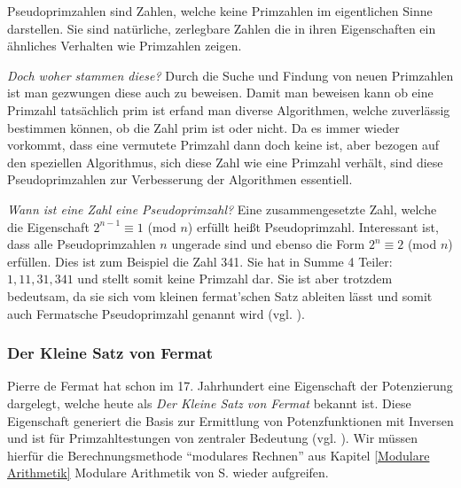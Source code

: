 \documentclass[12pt,a4paper]{article}
\theoremstyle{definition}
\begin{document}
Pseudoprimzahlen sind Zahlen, welche keine Primzahlen im eigentlichen Sinne darstellen.
Sie sind natürliche, zerlegbare Zahlen die in ihren Eigenschaften ein ähnliches Verhalten wie Primzahlen zeigen.

\textit{Doch woher stammen diese?}\newline
Durch die Suche und Findung von neuen Primzahlen ist man gezwungen diese auch zu beweisen.
Damit man beweisen kann ob eine Primzahl tatsächlich prim ist erfand man diverse Algorithmen, welche zuverlässig bestimmen können, ob die Zahl prim ist oder nicht.
Da es immer wieder vorkommt, dass eine vermutete Primzahl dann doch keine ist, aber bezogen auf den speziellen Algorithmus, sich diese Zahl wie eine Primzahl verhält, sind diese Pseudoprimzahlen zur Verbesserung der Algorithmen essentiell.

\textit{Wann ist eine Zahl eine Pseudoprimzahl?}\newline
Eine zusammengesetzte Zahl, welche die Eigenschaft $2^{n-1}\equiv 1$ (mod $n$) erfüllt heißt Pseudoprimzahl.
Interessant ist, dass alle Pseudoprimzahlen $n$ ungerade sind und ebenso die Form $2^n \equiv 2$ (mod $n$) erfüllen. 
Dies ist zum Beispiel die Zahl 341.
Sie hat in Summe 4 Teiler: $1, 11, 31, 341$ und stellt somit keine Primzahl dar.
Sie ist aber trotzdem bedeutsam, da sie sich vom kleinen fermat'schen Satz ableiten lässt und somit auch Fermatsche Pseudoprimzahl genannt wird (vgl. \cite[91]{Ribenboim2006}).

\subsubsection{Der Kleine Satz von Fermat}\label{Der Kleine Satz von Fermat}
Pierre de Fermat hat schon im 17. Jahrhundert eine Eigenschaft der Potenzierung dargelegt, welche heute als \textit{Der Kleine Satz von Fermat} bekannt ist. 
Diese Eigenschaft generiert die Basis zur Ermittlung von Potenzfunktionen mit Inversen und ist für Primzahltestungen von zentraler Bedeutung (vgl. \cite[303]{Meinel2015}).
Wir müssen hierfür die Berechnungsmethode “modulares Rechnen” aus Kapitel \ref{Modulare Arithmetik} Modulare Arithmetik von S. \pageref{Modulare Arithmetik} wieder aufgreifen.
\end{document}
